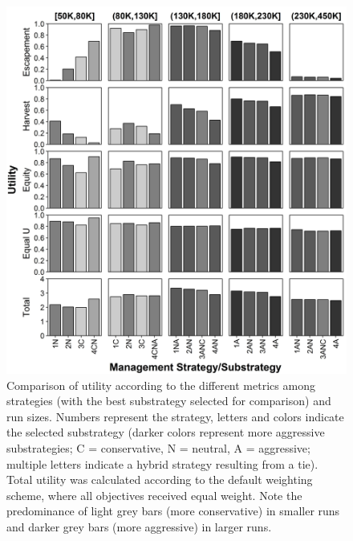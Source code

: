 \documentclass[12pt,]{book}
\theoremstyle{definition}
\theoremstyle{definition}
\theoremstyle{definition}
\theoremstyle{remark}
\begin{document}
\begin{singlespace}
\clearpage
\begin{figure}
  \centering
  \includegraphics{img/Ch3/btwn-ms-utilities.jpg}
  \caption{Comparison of utility according to the different metrics among strategies (with the best substrategy selected for comparison) and run sizes. Numbers represent the strategy, letters and colors indicate the selected substrategy (darker colors represent more aggressive substrategies; C = conservative, N = neutral, A = aggressive; multiple letters indicate a hybrid strategy resulting from a tie). Total utility was calculated according to the default weighting scheme, where all objectives received equal weight. Note the predominance of light grey bars (more conservative) in smaller runs and darker grey bars (more aggressive) in larger runs.}
  \label{fig:btwn-ms-utilities}
\end{figure}


\end{singlespace}
\end{document}
